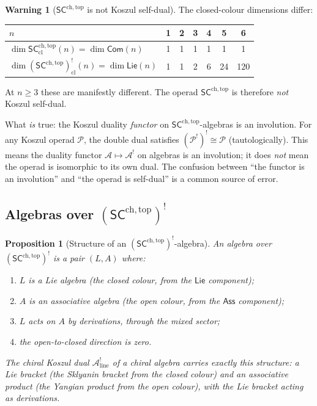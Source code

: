 \documentclass[11pt,reqno]{amsart}
\newtheorem{proposition}[theorem]{Proposition}
\theoremstyle{definition}
\newtheorem{warning}[theorem]{Warning}
\theoremstyle{remark}
\newcommand{\cA}{\mathcal{A}}
\newcommand{\cP}{\mathcal{P}}
\newcommand{\SCchtop}{\mathsf{SC}^{\mathrm{ch,top}}}
\newcommand{\Ass}{\mathsf{Ass}}
\newcommand{\Com}{\mathsf{Com}}
\newcommand{\Lie}{\mathsf{Lie}}
\numberwithin{equation}{section}
\providecommand{\ClaimStatusProvedHere}{}
\begin{document}
\begin{warning}[$\SCchtop$ is not Koszul self-dual]
\label{warn:not-self-dual}
The closed-colour dimensions differ:
\begin{center}
\renewcommand{\arraystretch}{1.2}
\begin{tabular}{lcccccc}
  \toprule
  $n$ & 1 & 2 & 3 & 4 & 5 & 6 \\
  \midrule
  $\dim \SCchtop_{\mathrm{cl}}(n) = \dim\Com(n)$
  & 1 & 1 & 1 & 1 & 1 & 1 \\
  $\dim (\SCchtop)^!_{\mathrm{cl}}(n) = \dim\Lie(n)$
  & 1 & 1 & 2 & 6 & 24 & 120 \\
  \bottomrule
\end{tabular}
\end{center}
At $n \geq 3$ these are manifestly different.  The operad
$\SCchtop$ is therefore \emph{not} Koszul self-dual.

What \emph{is} true: the Koszul duality \emph{functor} on
$\SCchtop$-algebras is an involution.  For any Koszul operad
$\cP$, the double dual satisfies $(\cP^!)^! \cong \cP$
(tautologically).  This means the duality functor
$\cA \mapsto \cA^!$ on algebras is an involution; it does
\emph{not} mean the operad is isomorphic to its own dual.
The confusion between ``the functor is an involution'' and
``the operad is self-dual'' is a common source of error.
\end{warning}

\subsection{Algebras over $(\SCchtop)^!$}

\begin{proposition}[Structure of an $(\SCchtop)^!$-algebra]
\label{prop:SC-dual-algebra}
\ClaimStatusProvedHere{}
An algebra over $(\SCchtop)^!$ is a pair $(L, A)$ where:
\begin{enumerate}[label=(\roman*)]
\item $L$ is a Lie algebra (the closed colour, from the
  $\Lie$ component);
\item $A$ is an associative algebra (the open colour, from
  the $\Ass$ component);
\item $L$ acts on $A$ by derivations, through the mixed
  sector;
\item the open-to-closed direction is zero.
\end{enumerate}
The chiral Koszul dual $\cA^!_{\mathrm{line}}$ of a chiral
algebra carries exactly this structure: a Lie bracket
(the Sklyanin bracket from the closed colour) and an
associative product (the Yangian product from the open colour),
with the Lie bracket acting as derivations.
\end{proposition}
\end{document}

